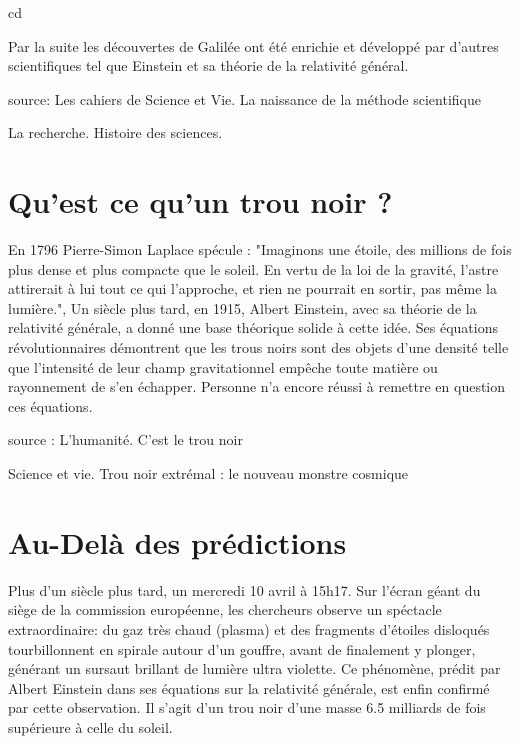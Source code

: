 cd\documentclass{article}
\begin{document}
Par la suite les découvertes de Galilée ont été enrichie et développé par d'autres scientifiques tel que Einstein et sa théorie de la relativité général.

source: Les cahiers de Science et Vie. La naissance de la méthode scientifique

        La recherche. Histoire des sciences.

\label{sec:article1} %

\section{Qu'est ce qu'un trou noir ?}
En 1796 Pierre-Simon Laplace spécule : "Imaginons une étoile, des millions de fois plus dense et plus compacte que le soleil. En vertu de la loi de la gravité, l'astre attirerait à lui tout ce qui l'approche, et rien ne pourrait en sortir, pas même la lumière.", Un siècle plus tard, en 1915, Albert Einstein, avec sa théorie de la relativité générale, a donné une base théorique solide à cette idée. Ses équations révolutionnaires démontrent que les trous noirs sont des objets d'une densité telle que l'intensité de leur champ gravitationnel empêche toute matière ou rayonnement de s'en échapper. Personne n'a encore réussi à remettre en question ces équations.

source : L'humanité. C'est le trou noir

Science et vie. Trou noir extrémal : le nouveau monstre cosmique

\label{sec:article2} %

\section{Au-Delà des prédictions}%

Plus d'un siècle plus tard, un mercredi 10 avril à 15h17. Sur l'écran géant du siège de la commission européenne, les chercheurs observe un spéctacle extraordinaire: du gaz très chaud (plasma) et des fragments d'étoiles disloqués tourbillonnent en spirale autour d'un gouffre, avant de finalement y plonger, générant un sursaut brillant de lumière ultra violette. Ce phénomène, prédit par Albert Einstein dans ses équations sur la relativité générale, est enfin confirmé par cette observation. Il s'agit d'un trou noir d'une masse 6.5 milliards de fois supérieure à celle du soleil.
\end{document}
